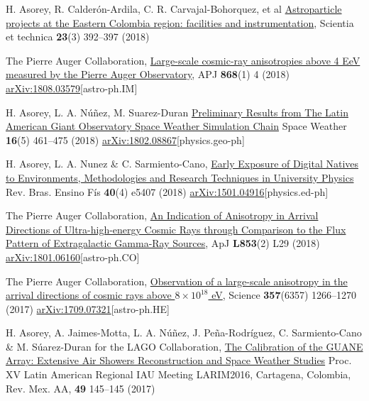 \begin{etaremune}
\item {}H. Asorey, R. Calderón-Ardila, C. R. Carvajal-Bohorquez, et al \href{http://dx.doi.org/10.22517/23447214.17561}{Astroparticle projects at the Eastern Colombia region: facilities and instrumentation}, Scientia et technica {\textbf{23}}(3) 392--397 (2018)

\item {}The Pierre Auger Collaboration, \href{}{{Large-scale cosmic-ray anisotropies above 4 EeV measured by the Pierre Auger Observatory}}, APJ {\textbf{868}}(1) 4 (2018) \href{https://arxiv.org/abs/1808.03579}{arXiv:1808.03579}[astro-ph.IM]

\item {}H. Asorey, L. A. Núñez, M. Suarez-Duran \href{https://doi.org/10.1002/2017SW001774}{{Preliminary Results from The Latin American Giant Observatory Space Weather Simulation Chain}} Space Weather {\textbf{16}}(5) 461--475 (2018) \href{https://arxiv.org/abs/1802.08867}{arXiv:1802.08867}[physics.geo-ph]

\item {} H. Asorey, L. A. Nunez \& C. Sarmiento-Cano, \href{http://dx.doi.org/10.1590/1806-9126-rbef-2018-0092}{{Early Exposure of Digital Natives to Environments, Methodologies and Research Techniques in University Physics}} Rev.
Bras.
Ensino Fís {\textbf{40}}(4) e5407 (2018) \href{http://arxiv.org/abs/1501.04916}{arXiv:1501.04916}[physics.ed-ph]

\item {}The Pierre Auger Collaboration, \href{https://doi.org/10.3847/2041-8213/aaa66d}{{An Indication of Anisotropy in Arrival Directions of Ultra-high-energy Cosmic Rays through Comparison to the Flux Pattern of Extragalactic Gamma-Ray Sources}}, ApJ {\textbf{L853}}(2) L29 (2018) \href{https://arxiv.org/abs/1801.06160}{arXiv:1801.06160}[astro-ph.CO]

\item {}The Pierre Auger Collaboration, \href{https://doi.org/10.1126/science.aan4338}{{Observation of a large-scale anisotropy in the arrival directions of cosmic rays above $8\times 10^{18}$ eV}}, Science {\textbf{357}}(6357) 1266--1270 (2017) \href{https://arxiv.org/abs/1709.07321}{arXiv:1709.07321}[astro-ph.HE]

\item {} H. Asorey, A. Jaimes-Motta, L. A. Núñez, J. Peña-Rodríguez, C. Sarmiento-Cano \& M. Súarez-Duran for the LAGO Collaboration, \href{http://www.astroscu.unam.mx/rmaa/RMxAC..49/PDF/RMxAC..49\_poster3.pdf}{{The Calibration of the GUANE Array: Extensive Air Showers Reconstruction and Space Weather Studies}} \en Proc.
XV Latin American Regional IAU Meeting LARIM2016, Cartagena, Colombia, Rev.
Mex.
AA, {\textbf{49}} 145--145 (2017)


\end{etaremune}
